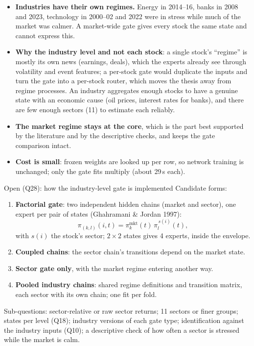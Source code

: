 \begin{whybox}
\begin{itemize}
\item \textbf{Industries have their own regimes.} Energy in 2014--16, banks in 2008 and 2023, technology in
  2000--02 and 2022 were in stress while much of the market was calmer. A market-wide gate gives every
  stock the same state and cannot express this.
\item \textbf{Why the industry level and not each stock}: a single stock's ``regime'' is mostly its own news
  (earnings, deals), which the experts already see through volatility and event features; a per-stock gate
  would duplicate the inputs and turn the gate into a per-stock router, which moves the thesis away from
  regime processes. An industry aggregates enough stocks to have a genuine state with an economic cause
  (oil prices, interest rates for banks), and there are few enough sectors (11) to estimate each reliably.
\item \textbf{The market regime stays at the core}, which is the part best supported by the literature and by
  the descriptive checks, and keeps the gate comparison intact.
\item \textbf{Cost is small}: frozen weights are looked up per row, so network training is unchanged; only the
  gate fits multiply (about 29\,s each).
\end{itemize}
\end{whybox}

\begin{openbox}{Open (Q28): how the industry-level gate is implemented}
Candidate forms:
\begin{enumerate}[label=(\alph*)]
\item \textbf{Factorial gate}: two independent hidden chains (market and sector), one expert per pair of
  states (Ghahramani \& Jordan 1997):
  \[\pi_{(k,l)}(i,t)=\pi^{\text{mkt}}_k(t)\,\pi^{\,s(i)}_l(t),\]
  with $s(i)$ the stock's sector; $2\times2$ states gives 4 experts, inside the envelope.
\item \textbf{Coupled chains}: the sector chain's transitions depend on the market state.
\item \textbf{Sector gate only}, with the market regime entering another way.
\item \textbf{Pooled industry chains}: shared regime definitions and transition matrix, each sector with its
  own chain; one fit per fold.
\end{enumerate}
Sub-questions: sector-relative or raw sector returns; 11 sectors or finer groups; states per level (Q18);
industry versions of each gate type; identification against the industry inputs (Q10); a descriptive
check of how often a sector is stressed while the market is calm.
\end{openbox}
